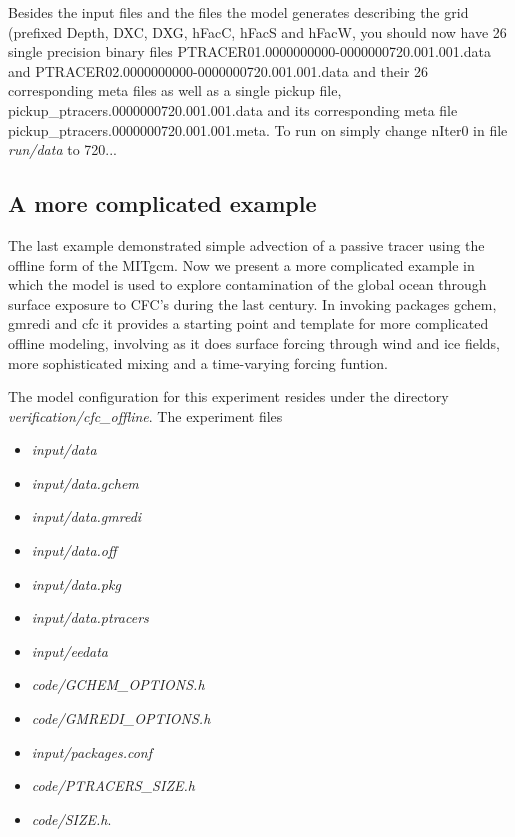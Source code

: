 Besides the input files and the files the model generates describing
the grid (prefixed Depth, DXC, DXG, hFacC, hFacS and hFacW, you should
now have 26 single precision binary files
PTRACER01.0000000000-0000000720.001.001.data and
PTRACER02.0000000000-0000000720.001.001.data and their 26
corresponding meta files as well as a single pickup file,
pickup\_ptracers.0000000720.001.001.data and its corresponding meta
file pickup\_ptracers.0000000720.001.001.meta. To run on simply change
nIter0 in file {\it run/data} to 720...

\subsection{A more complicated example}

\noindent The last example demonstrated simple advection of a passive
tracer using the offline form of the MITgcm. Now we present a more
complicated example in which the model is used to explore
contamination of the global ocean through surface exposure to CFC's
during the last century. In invoking packages gchem, gmredi and cfc it
provides a starting point and template for more complicated offline
modeling, involving as it does surface forcing through wind and ice
fields, more sophisticated mixing and a time-varying forcing funtion.

\vspace{0.5cm}

\noindent The model configuration for this experiment resides under
the directory {\it verification/cfc\_offline}.  The experiment files

\begin{itemize}
\item {\it input/data}
\item {\it input/data.gchem}
\item {\it input/data.gmredi}
\item {\it input/data.off}
\item {\it input/data.pkg}
\item {\it input/data.ptracers}
\item {\it input/eedata}
\item {\it code/GCHEM\_OPTIONS.h}
\item {\it code/GMREDI\_OPTIONS.h}
\item {\it input/packages.conf}
\item {\it code/PTRACERS\_SIZE.h}
\item {\it code/SIZE.h}. 
\end{itemize}

